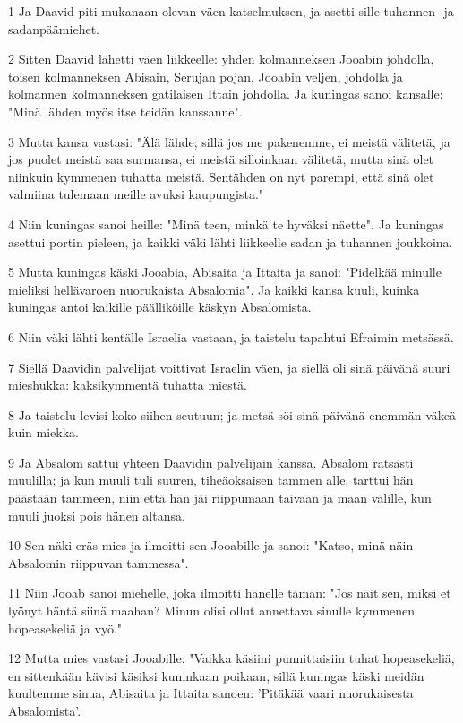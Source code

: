 \par 1 Ja Daavid piti mukanaan olevan väen katselmuksen, ja asetti sille tuhannen- ja sadanpäämiehet.
\par 2 Sitten Daavid lähetti väen liikkeelle: yhden kolmanneksen Jooabin johdolla, toisen kolmanneksen Abisain, Serujan pojan, Jooabin veljen, johdolla ja kolmannen kolmanneksen gatilaisen Ittain johdolla. Ja kuningas sanoi kansalle: "Minä lähden myös itse teidän kanssanne".
\par 3 Mutta kansa vastasi: "Älä lähde; sillä jos me pakenemme, ei meistä välitetä, ja jos puolet meistä saa surmansa, ei meistä silloinkaan välitetä, mutta sinä olet niinkuin kymmenen tuhatta meistä. Sentähden on nyt parempi, että sinä olet valmiina tulemaan meille avuksi kaupungista."
\par 4 Niin kuningas sanoi heille: "Minä teen, minkä te hyväksi näette". Ja kuningas asettui portin pieleen, ja kaikki väki lähti liikkeelle sadan ja tuhannen joukkoina.
\par 5 Mutta kuningas käski Jooabia, Abisaita ja Ittaita ja sanoi: "Pidelkää minulle mieliksi hellävaroen nuorukaista Absalomia". Ja kaikki kansa kuuli, kuinka kuningas antoi kaikille päälliköille käskyn Absalomista.
\par 6 Niin väki lähti kentälle Israelia vastaan, ja taistelu tapahtui Efraimin metsässä.
\par 7 Siellä Daavidin palvelijat voittivat Israelin väen, ja siellä oli sinä päivänä suuri mieshukka: kaksikymmentä tuhatta miestä.
\par 8 Ja taistelu levisi koko siihen seutuun; ja metsä söi sinä päivänä enemmän väkeä kuin miekka.
\par 9 Ja Absalom sattui yhteen Daavidin palvelijain kanssa. Absalom ratsasti muulilla; ja kun muuli tuli suuren, tiheäoksaisen tammen alle, tarttui hän päästään tammeen, niin että hän jäi riippumaan taivaan ja maan välille, kun muuli juoksi pois hänen altansa.
\par 10 Sen näki eräs mies ja ilmoitti sen Jooabille ja sanoi: "Katso, minä näin Absalomin riippuvan tammessa".
\par 11 Niin Jooab sanoi miehelle, joka ilmoitti hänelle tämän: "Jos näit sen, miksi et lyönyt häntä siinä maahan? Minun olisi ollut annettava sinulle kymmenen hopeasekeliä ja vyö."
\par 12 Mutta mies vastasi Jooabille: "Vaikka käsiini punnittaisiin tuhat hopeasekeliä, en sittenkään kävisi käsiksi kuninkaan poikaan, sillä kuningas käski meidän kuultemme sinua, Abisaita ja Ittaita sanoen: 'Pitäkää vaari nuorukaisesta Absalomista'.
